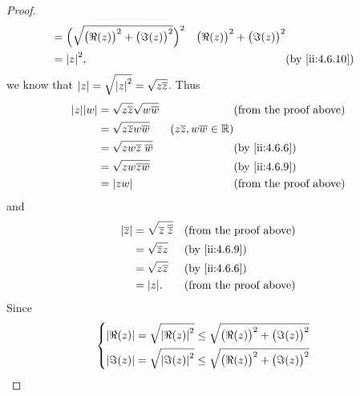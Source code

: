 \begin{proof}
\begin{align*}
                   & = \Big(\sqrt{\big(\Re(z)\big)^2 + \big(\Im(z)\big)^2}\Big)^2                                    & \big(\Re(z)\big)^2 + \big(\Im(z)\big)^2                  \\
                   & = \abs{z}^2,                                                                                    &                                         & \by{ii:4.6.10}
  \end{align*}
  we know that \(\left\lvert z\right\rvert = \sqrt{\left\lvert z\right\rvert^2} = \sqrt{z \overline{z}}\).
  Thus
  \begin{align*}
    \abs{z} \abs{w} & = \sqrt{z \overline{z}} \sqrt{w \overline{w}} &                                         & \text{(from the proof above)} \\
                    & = \sqrt{z \overline{z} w \overline{w}}        & (z \overline{z}, w \overline{w} \in \R)                                 \\
                    & = \sqrt{zw \overline{z} \; \overline{w}}      &                                         & \by{ii:4.6.6}                 \\
                    & = \sqrt{zw \overline{zw}}                     &                                         & \by{ii:4.6.9}                 \\
                    & = \abs{zw}                                    &                                         & \text{(from the proof above)}
  \end{align*}
  and
  \begin{align*}
    \abs{\overline{z}} & = \sqrt{\overline{z} \; \overline{\overline{z}}} &  & \text{(from the proof above)} \\
                       & = \sqrt{\overline{z} z}                          &  & \by{ii:4.6.9}                 \\
                       & = \sqrt{z \overline{z}}                          &  & \by{ii:4.6.6}                 \\
                       & = \abs{z}.                                       &  & \text{(from the proof above)}
  \end{align*}
  Since
  \begin{align*}
             & \begin{dcases}
                 \abs{\Re(z)} = \sqrt{\abs{\Re(z)}^2} \leq \sqrt{\big(\Re(z)\big)^2 + \big(\Im(z)\big)^2} \\
                 \abs{\Im(z)} = \sqrt{\abs{\Im(z)}^2} \leq \sqrt{\big(\Re(z)\big)^2 + \big(\Im(z)\big)^2} \\

\end{dcases}
\end{align*}
\end{proof}
